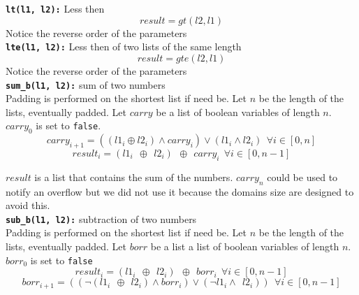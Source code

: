   \texttt{\textbf{lt(l1, l2):}} Less then\\
  \begin{equation}
      result = gt(l2, l1)
  \end{equation}
  Notice the reverse order of the parameters\\

  \texttt{\textbf{lte(l1, l2):}} Less then of two lists of the same length\\
  \begin{equation}
      result = gte(l2, l1)
  \end{equation}
  Notice the reverse order of the parameters\\

  \texttt{\textbf{sum\_b(l1, l2):}} sum of two numbers\\
  Padding is performed on the shortest list if need be.
  Let $n$ be the length of the lists, eventually padded. Let $carry$ be a list of boolean
  variables of length $n$. $carry_0$ is set to \texttt{false}.  
  \begin{equation}
      carry_{i+1} = ((l1_i \oplus l2_i) \wedge carry_i) \vee (l1_i \wedge l2_i)  \  \ \forall i \in [0, n]
  \end{equation}
  \begin{equation}
          result_i = (l1_i \ \ \oplus \ \ l2_i) \ \ \oplus \ \ carry_i \  \ \forall i \in [0, n-1]
  \end{equation}

  $result$ is a list that contains the sum of the numbers. $carry_n$ could be used to
  notify an overflow but we did  not use it because the domains size are designed to avoid this.\\

  \texttt{\textbf{sub\_b(l1, l2):}} subtraction of two numbers\\
  Padding is performed on the shortest list if need be.
  Let $n$ be the length of the lists, eventually padded.
  Let $borr$ be a list a list of boolean variables of length $n$. $borr_0$ is set to \texttt{false} 
  \begin{equation}
      result_i = (l1_i \ \ \oplus \ \ l2_i) \ \ \oplus \ \ borr_i \  \ \forall i \in [0, n-1]
  \end{equation}
  \begin{equation}
      borr_{i+1} = ((\neg (l1_i \ \ \oplus \ \ l2_i) \wedge borr_i) \vee (\neg l1_i \wedge \ \ l2_i)) \  \ 
      \forall i \in [0, n-1]
  \end{equation}

